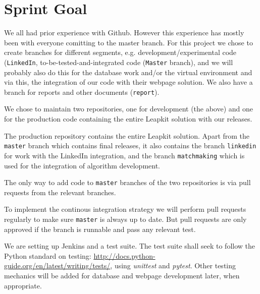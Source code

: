\section{Sprint Goal}

We all had prior experience with Github. However this experience has mostly been with everyone comitting to the master branch. For this project we chose to create branches for different segments, e.g. development/experimental code (\texttt{LinkedIn}, to-be-tested-and-integrated code (\texttt{Master} branch), and we will probably also do this for the database work and/or the virtual environment and via this, the integration of our code with their webpage solution.
We also have a branch for reports and other documents (\texttt{report}).

We chose to maintain two repositories, one for development (the above) and one for the production code containing the entire Leapkit solution with our releases.

The production repository contains the entire Leapkit solution. Apart from the \texttt{master}
branch which contains final releases, it also contains the branch \texttt{linkedin} for work with the LinkedIn integration, and the branch \texttt{matchmaking} which is used for the integration of algorithm development.

The only way to add code to \texttt{master} branches of the two repositories is via pull requests from the relevant branches.

To implement the continous integration strategy we will perform pull requests regularly
to make sure \texttt{master} is always up to date. But pull requests are only approved if the branch is runnable and pass any relevant test.

We are setting up Jenkins and a test suite. The test suite shall seek to follow the Python standard on testing: \url{http://docs.python-guide.org/en/latest/writing/tests/}, using \textit{unittest} and \textit{pytest}. Other testing mechanics will be added for database and webpage development later, when appropriate.
